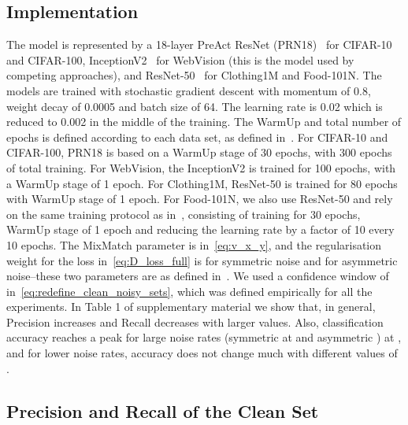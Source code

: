 \documentclass{article}
\begin{document}
\subsection{Implementation}

The model  is represented by a 18-layer PreAct ResNet (PRN18)~\cite{he2016identity} 
 for CIFAR-10 and CIFAR-100, InceptionV2~\cite{szegedy2017inception} for WebVision (this is the model used by competing approaches), and ResNet-50~\cite{he2016deep} for Clothing1M and Food-101N.
The models are trained with stochastic gradient descent with momentum of 0.8, weight decay of 0.0005 and batch size of 64. The learning rate is 0.02 which is reduced to 0.002 in the middle of the training. The WarmUp and total number of epochs is defined according to each data set, as defined in~\cite{li2020dividemix}.
For CIFAR-10 and CIFAR-100, PRN18 is based on a WarmUp stage of 30 epochs, with 300 epochs of total training.
For WebVision, the InceptionV2 is trained for 100 epochs, with a WarmUp stage of 1 epoch.
For Clothing1M, ResNet-50 is trained for 80 epochs with WarmUp stage of 1 epoch.
For Food-101N, we also use ResNet-50 and rely on the same training protocol as in~\cite{han2019deep}, consisting of training for 30 epochs, WarmUp stage of 1 epoch and reducing the learning rate by a factor of 10 every 10 epochs.
The MixMatch parameter is  in~\eqref{eq:v_x_y}, and 
the regularisation weight for the loss in~\eqref{eq:D_loss_full} is  for symmetric noise and  for asymmetric noise--these two parameters are as defined in~\cite{li2020dividemix}. 
We used a confidence window of  in~\eqref{eq:redefine_clean_noisy_sets}, which was defined empirically for all the experiments. In Table 1 of supplementary material we show that, in general, Precision increases and Recall decreases with larger  values.  Also, classification accuracy reaches a peak for large noise rates (symmetric at  and asymmetric ) at , and for lower noise rates, accuracy does not change much with different values of .




\subsection{Precision and Recall of the Clean Set}
\end{document}
